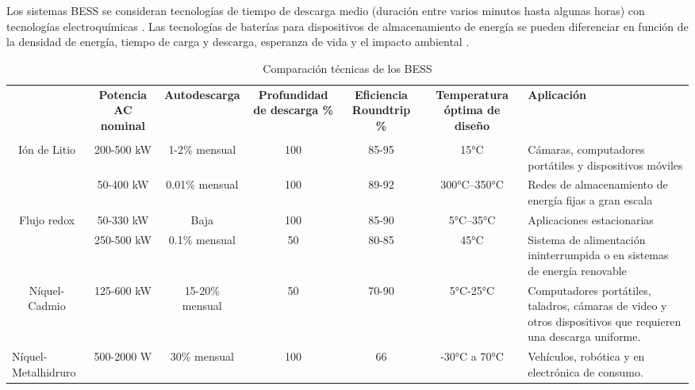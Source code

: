\newline
Los sistemas BESS se consideran tecnologías de tiempo de descarga medio (duración entre varios minutos hasta algunas horas) con tecnologías electroquímicas \cite{bess_distritall}. Las tecnologías de baterías para dispositivos de almacenamiento de energía se pueden diferenciar en función de la densidad de energía, tiempo de carga y descarga, esperanza de vida y el impacto ambiental \cite{Handbook}.
\newpage
\begin{table}[htbp]

  \centering
  \caption{Comparación técnicas de los BESS}
  \resizebox{16cm}{!} {
    \begin{tabular}{|p{10em}|c|c|c|c|c|p{11em}|}
    \rowcolor[rgb]{ .051,  .051,  .051} \multicolumn{1}{|c|}{\textcolor[rgb]{ 1,  1,  1}{\textbf{PARÁMETROS }}} & \multicolumn{1}{p{10em}|}{\textcolor[rgb]{ 1,  1,  1}{\textbf{Potencia AC nominal}}} & \multicolumn{1}{p{10em}|}{\textcolor[rgb]{ 1,  1,  1}{\textbf{Autodescarga}}} & \multicolumn{1}{p{10em}|}{\textcolor[rgb]{ 1,  1,  1}{\textbf{Profundidad de descarga \%}}} & \multicolumn{1}{p{10em}|}{\textcolor[rgb]{ 1,  1,  1}{\textbf{Eficiencia Roundtrip \newline{}\%}}} & \multicolumn{1}{p{10em}|}{\textcolor[rgb]{ 1,  1,  1}{\textbf{Temperatura óptima de diseño}}} & \textcolor[rgb]{ 1,  1,  1}{\textbf{Aplicación}} \\
    \rowcolor[rgb]{ .051,  .051,  .051} \multicolumn{1}{|c|}{\textcolor[rgb]{ 1,  1,  1}{\textbf{BATERÍAS}}} & \textcolor[rgb]{ 1,  1,  1}{} & \textcolor[rgb]{ 1,  1,  1}{} & \textcolor[rgb]{ 1,  1,  1}{} & \textcolor[rgb]{ 1,  1,  1}{} & \textcolor[rgb]{ 1,  1,  1}{} & \multicolumn{1}{r|}{\textcolor[rgb]{ 1,  1,  1}{}} \\
    \multicolumn{1}{|c|}{Ión de Litio} & \multicolumn{1}{|c|}{200-500 kW} & 1-2\% mensual  & 100   & 85-95 & 15°C  & Cámaras,  computadores portátiles y dispositivos móviles  \\
    \hline
    \rowcolor{gris} \multicolumn{1}{|c|}{Sulfuro de Sodio} & 50-400 kW & 0.01\%  mensual  & 100   & 89-92 & 300°C–350°C &  Redes de almacenamiento de energía fijas a gran escala \\
    \hline
    \multicolumn{1}{|c|}{Flujo redox} & 50-330 kW & Baja  & 100   & 85-90 & 5°C–35°C &  Aplicaciones \newline{}estacionarias  \\
    \hline
    \rowcolor{gris} \multicolumn{1}{|c|}{Plomo Ácido} & 250-500 kW & 0.1\% mensual & 50    & 80-85 & 45°C  & Sistema de alimentación ininterrumpida o en sistemas   de energía renovable \\
    \hline
    \multicolumn{1}{|c|}{ Níquel-Cadmio} & 125-600 kW & 15-20\% mensual & 50    & 70-90 & 5°C-25°C & Computadores portátiles, taladros, cámaras de video  y otros dispositivos que requieren una descarga  uniforme. \\
    \hline
    \rowcolor{gris} Níquel-Metalhidruro & 500-2000 W & 30\% mensual & 100   & 66    & -30°C a 70°C &  Vehículos, robótica y en electrónica de consumo.    \\
    \bottomrule
    \end{tabular}%
    }
  \label{tab:addlabel}%
  

\end{table}
